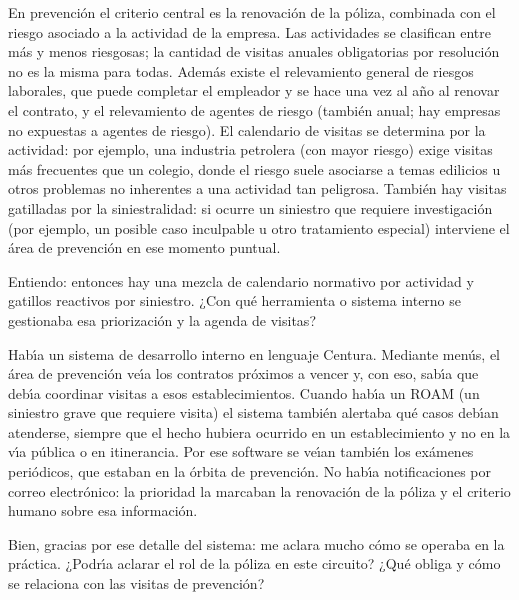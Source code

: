 \begin{description}[style=nextline, leftmargin=0cm, labelsep=0.35cm]
\item[\textbf{Entrevistado:}]
En prevenci\'on el criterio central es la renovaci\'on de la p\'oliza, combinada con el riesgo asociado a la actividad de la empresa.
Las actividades se clasifican entre m\'as y menos riesgosas; la cantidad de visitas anuales obligatorias por resoluci\'on no es la misma para todas.
Adem\'as existe el relevamiento general de riesgos laborales, que puede completar el empleador y se hace una vez al a\~no al renovar el contrato, y el relevamiento de agentes de riesgo (tambi\'en anual; hay empresas no expuestas a agentes de riesgo).
El calendario de visitas se determina por la actividad: por ejemplo, una industria petrolera (con mayor riesgo) exige visitas m\'as frecuentes que un colegio, donde el riesgo suele asociarse a temas edilicios u otros problemas no inherentes a una actividad tan peligrosa.
Tambi\'en hay visitas gatilladas por la siniestralidad: si ocurre un siniestro que requiere investigaci\'on (por ejemplo, un posible caso inculpable u otro tratamiento especial) interviene el \'area de prevenci\'on en ese momento puntual.

\item[\textbf{Entrevistador:}]
Entiendo: entonces hay una mezcla de calendario normativo por actividad y gatillos reactivos por siniestro.
¿Con qu\'e herramienta o sistema interno se gestionaba esa priorizaci\'on y la agenda de visitas?

\item[\textbf{Entrevistado:}]
Hab\'{\i}a un sistema de desarrollo interno en lenguaje Centura.
Mediante men\'us, el \'area de prevenci\'on ve\'{\i}a los contratos pr\'oximos a vencer y, con eso, sab\'{\i}a que deb\'{\i}a coordinar visitas a esos establecimientos.
Cuando hab\'{\i}a un ROAM (un siniestro grave que requiere visita) el sistema tambi\'en alertaba qu\'e casos deb\'{\i}an atenderse, siempre que el hecho hubiera ocurrido en un establecimiento y no en la v\'{\i}a p\'ublica o en itinerancia.
Por ese software se ve\'{\i}an tambi\'en los ex\'amenes peri\'odicos, que estaban en la \'orbita de prevenci\'on.
No hab\'{\i}a notificaciones por correo electr\'onico: la prioridad la marcaban la renovaci\'on de la p\'oliza y el criterio humano sobre esa informaci\'on.

\item[\textbf{Entrevistador:}]
Bien, gracias por ese detalle del sistema: me aclara mucho c\'omo se operaba en la pr\'actica.
¿Podr\'{\i}a aclarar el rol de la p\'oliza en este circuito? ¿Qu\'e obliga y c\'omo se relaciona con las visitas de prevenci\'on?


\end{description}
